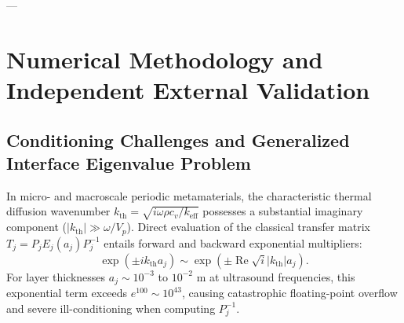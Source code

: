 \documentclass[11pt,a4paper]{article}
\begin{document}
---

\section{Numerical Methodology and Independent External Validation}
\label{sec:numerical}

\subsection{Conditioning Challenges and Generalized Interface Eigenvalue Problem}
In micro- and macroscale periodic metamaterials, the characteristic thermal diffusion wavenumber $k_{\text{th}} = \sqrt{i\omega\rho c_v/k_{\text{eff}}}$ possesses a substantial imaginary component ($|k_{\text{th}}| \gg \omega / V_p$). Direct evaluation of the classical transfer matrix $T_j = P_j E_j(a_j) P_j^{-1}$ entails forward and backward exponential multipliers:
\begin{equation}
\exp\left( \pm i k_{\text{th}} a_j \right) \sim \exp\left( \pm \operatorname{Re}\sqrt{i} |k_{\text{th}}| a_j \right).
\end{equation}
For layer thicknesses $a_j \sim 10^{-3}$ to $10^{-2}\text{ m}$ at ultrasound frequencies, this exponential term exceeds $e^{100} \sim 10^{43}$, causing catastrophic floating-point overflow and severe ill-conditioning when computing $P_j^{-1}$.
\end{document}
